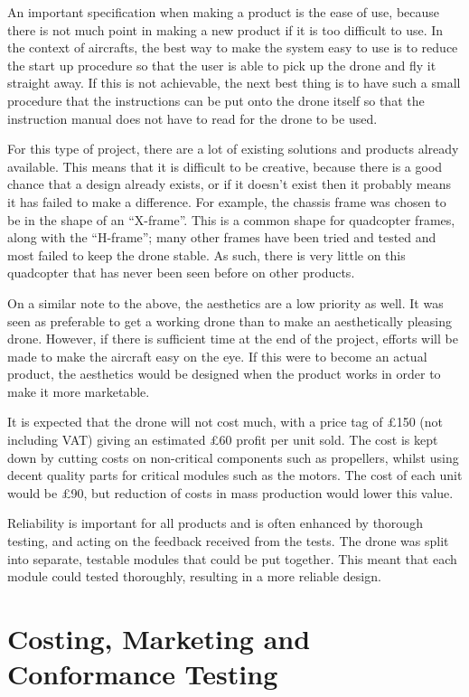 \documentclass[a4paper]{article}
\begin{document}
An important specification when making a product is the ease of use, because there is not much point in making a new product if it is too difficult to use. In the context of aircrafts, the best way to make the system easy to use is to reduce the start up procedure so that the user is able to pick up the drone and fly it straight away. If this is not achievable, the next best thing is to have such a small procedure that the instructions can be put onto the drone itself so that the instruction manual does not have to read for the drone to be used.

For this type of project, there are a lot of existing solutions and products already available. This means that it is difficult to be creative, because there is a good chance that a design already exists, or if it doesn’t exist then it probably means it has failed to make a difference. For example, the chassis frame was chosen to be in the shape of an “X-frame”. This is a common shape for quadcopter frames, along with the “H-frame”; many other frames have been tried and tested and most failed to keep the drone stable. As such, there is very little on this quadcopter that has never been seen before on other products.

On a similar note to the above, the aesthetics are a low priority as well. It was seen as preferable to get a working drone than to make an aesthetically pleasing drone. However, if there is sufficient time at the end of the project, efforts will be made to make the aircraft easy on the eye. If this were to become an actual product, the aesthetics would be designed when the product works in order to make it more marketable.

It is expected that the drone will not cost much, with a price tag of £150 (not including VAT) giving an estimated £60 profit per unit sold. The cost is kept down by cutting costs on non-critical components such as propellers, whilst using decent quality parts for critical modules such as the motors. The cost of each unit would be £90, but reduction of costs in mass production would lower this value.

Reliability is important for all products and is often enhanced by thorough testing, and acting on the feedback received from the tests. The drone was split into separate, testable modules that could be put together. This meant that each module could tested thoroughly, resulting in a more reliable design.

\section{Costing, Marketing and Conformance Testing}
\end{document}
